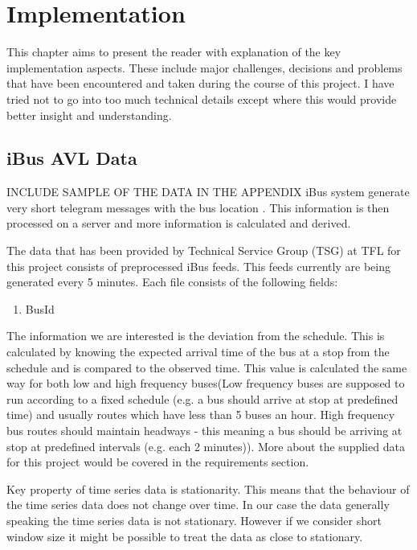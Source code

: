 \chapter{Implementation}
This chapter aims to present the reader with explanation of the key implementation aspects. These include major challenges, decisions and problems that have been encountered and taken during the course of this project. I have tried not to go into too much technical details except where this would provide better insight and understanding.

\section{iBus AVL Data}
INCLUDE SAMPLE OF THE DATA IN THE APPENDIX
iBus system generate very short telegram messages with the bus location \cite{Hounsell201276}. This information is then processed on a server and more information is calculated and derived.

The data that has been provided by Technical Service Group (TSG) at TFL for this project consists of preprocessed iBus feeds. This feeds currently are being generated every 5 minutes. Each file consists of the following fields:
\begin{enumerate}
\item BusId
\end{enumerate}

The information we are interested is the deviation from the schedule. This is calculated by knowing the expected arrival time of the bus at a stop from the schedule and is compared to the observed time. This value is calculated the same way for both low and high frequency buses(Low frequency buses are supposed to run according to a fixed schedule (e.g. a bus should arrive at stop at predefined time) and usually routes which have less than 5 buses an hour. High frequency bus routes should maintain headways - this meaning a bus should be arriving at stop at predefined intervals (e.g. each 2 minutes)). More about the supplied data for this project would be covered in the requirements section.

Key property of time series data is stationarity. This means that the behaviour of the time series data does not change over time. In our case the data generally speaking the time series data is not stationary. However if we consider short window size it might be possible to treat the data as close to stationary.

